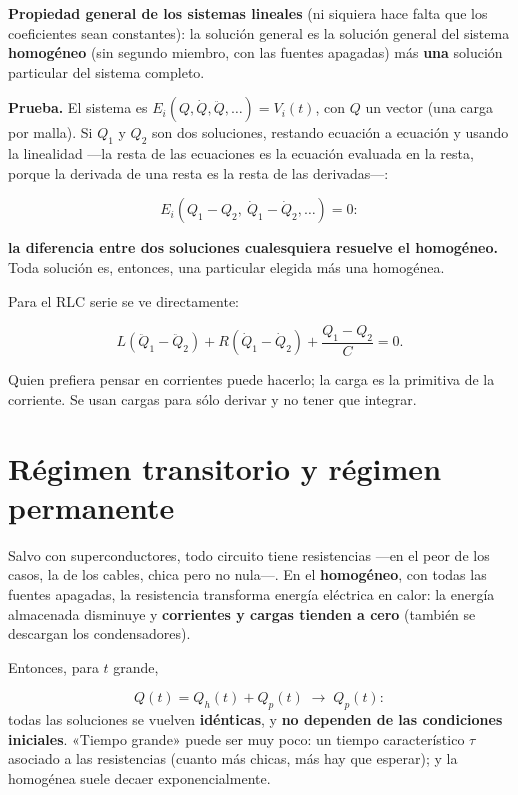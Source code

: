 \documentclass[12pt,a4paper]{article}
\begin{document}
\begin{notebox}
\textbf{Propiedad general de los sistemas lineales} (ni siquiera hace falta que
los coeficientes sean constantes): la solución general es la solución general
del sistema \textbf{homogéneo} (sin segundo miembro, con las fuentes apagadas) más
\textbf{una} solución particular del sistema completo.
\end{notebox}

\textbf{Prueba.} El sistema es $E_i(Q, \dot Q, \ddot Q,\dots) = V_i(t)$, con $Q$ un
vector (una carga por malla). Si $Q_1$ y $Q_2$ son dos soluciones, restando
ecuación a ecuación y usando la linealidad ---la resta de las ecuaciones es la
ecuación evaluada en la resta, porque la derivada de una resta es la resta de
las derivadas---:

\[
E_i(Q_1-Q_2,\ \dot Q_1-\dot Q_2,\dots) = 0 :
\]

\textbf{la diferencia entre dos soluciones cualesquiera resuelve el homogéneo.} Toda
solución es, entonces, una particular elegida más una homogénea.

Para el RLC serie se ve directamente:

\[
L(\ddot Q_1-\ddot Q_2) + R(\dot Q_1-\dot Q_2) + \frac{Q_1-Q_2}{C} = 0 .
\]

\begin{notebox}
Quien prefiera pensar en corrientes puede hacerlo; la carga es la primitiva
de la corriente. Se usan cargas para sólo derivar y no tener que integrar.
\end{notebox}

\section{Régimen transitorio y régimen permanente}

Salvo con superconductores, todo circuito tiene resistencias ---en el peor de los
casos, la de los cables, chica pero no nula---. En el \textbf{homogéneo}, con todas las
fuentes apagadas, la resistencia transforma energía eléctrica en calor: la
energía almacenada disminuye y \textbf{corrientes y cargas tienden a cero} (también
se descargan los condensadores).

Entonces, para $t$ grande,

\[
Q(t) = Q_h(t) + Q_p(t) \;\longrightarrow\; Q_p(t):
\]
todas las soluciones se vuelven \textbf{idénticas}, y \textbf{no dependen de las
condiciones iniciales}. «Tiempo grande» puede ser muy poco: un tiempo
característico $\tau$ asociado a las resistencias (cuanto más chicas, más hay
que esperar); y la homogénea suele decaer exponencialmente.
\end{document}
